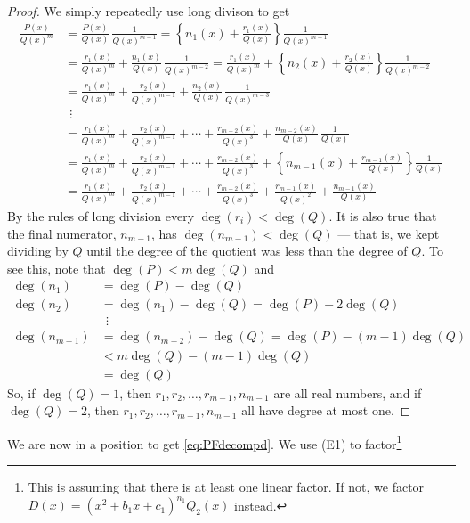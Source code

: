 \begin{proof}
 We simply repeatedly use long divison to get
\begin{align*}
\frac{P(x)}{Q(x)^m}
&=\frac{P(x)}{Q(x)}\,\frac{1}{Q(x)^{m-1}}
=\left\{n_1(x) + \frac{r_1(x)}{Q(x)}\right\}\frac{1}{Q(x)^{m-1}} \\
&= \frac{r_1(x)}{Q(x)^m}+\frac{n_1(x)}{Q(x)}\,\frac{1}{Q(x)^{m-2}}
= \frac{r_1(x)}{Q(x)^m}
 +\left\{n_2(x) + \frac{r_2(x)}{Q(x)}\right\}\frac{1}{Q(x)^{m-2}} \\
&= \frac{r_1(x)}{Q(x)^m} + 
  \frac{r_2(x)}{Q(x)^{m-1}}+\frac{n_2(x)}{Q(x)}\,\frac{1}{Q(x)^{m-3}} \\
&\ \ \vdots\\
&=   \frac{r_1(x)}{Q(x)^m} + \frac{r_2(x)}{Q(x)^{m-1}} +\cdots+
      \frac{r_{m-2}(x)}{Q(x)^3}
       +\frac{n_{m-2}(x)}{Q(x)}\,\frac{1}{Q(x)}\\
&=   \frac{r_1(x)}{Q(x)^m} + \frac{r_2(x)}{Q(x)^{m-1}} +\cdots+
      \frac{r_{m-2}(x)}{Q(x)^3}
       +\left\{n_{m-1}(x) + \frac{r_{m-1}(x)}{Q(x)}\right\}\frac{1}{Q(x)}\\
&=   \frac{r_1(x)}{Q(x)^m} + \frac{r_2(x)}{Q(x)^{m-1}} +\cdots+
      \frac{r_{m-2}(x)}{Q(x)^3}+\frac{r_{m-1}(x)}{Q(x)^2}
       +\frac{n_{m-1}(x)}{Q(x)} 
\end{align*}
By the rules of long division every $\deg(r_i)<\deg(Q)$.
It is also true that the final numerator, $n_{m-1}$, has 
$\deg(n_{m-1})<\deg(Q)$ --- that is, we kept dividing by $Q$ until the degree of the quotient was less than the degree of $Q$. To see this, note that 
$\deg(P)<m\deg(Q)$ and
\begin{align*}
\deg(n_1) &= \deg(P)-\deg(Q) \\
\deg(n_2) &= \deg(n_1)-\deg(Q)= \deg(P)-2\deg(Q) \\
&\ \ \vdots\\
\deg(n_{m-1}) &= \deg(n_{m-2})-\deg(Q)= \deg(P)-(m-1)\deg(Q) \\
              &<m\deg(Q)-(m-1)\deg(Q) \\
              &=\deg(Q)
\end{align*}
So, if $\deg(Q)=1$, then $r_1, r_2, \ldots, r_{m-1}, n_{m-1}$ are all 
real numbers, and if $\deg(Q)=2$, then
$r_1, r_2, \ldots, r_{m-1}, n_{m-1}$ all have degree at most one.
\end{proof}
We are now in a position to get \eqref{eq:PFdecompd}.
We use (E1) to factor\footnote{This is assuming that there is at least one 
linear factor. If not, we factor
$D(x) = (x^2+b_1x + c_1)^{n_1} Q_2(x)$ instead.} 
